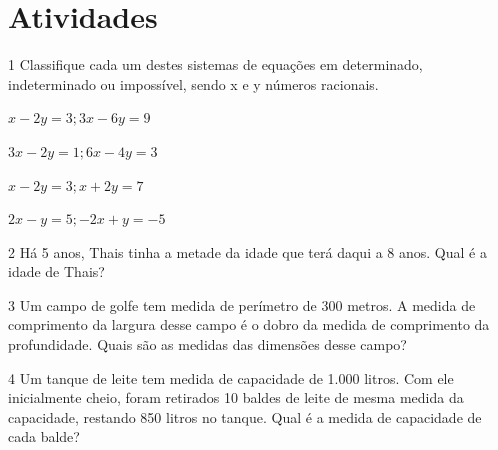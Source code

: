 \section{Atividades}

\num{1} Classifique cada um destes sistemas de equações em determinado,
indeterminado ou impossível, sendo x e y números racionais.

\begin{escolha}
\item $x - 2y = 3; 3x - 6y = 9$
\item $3x - 2y = 1; 6x - 4y = 3$
\item $x - 2y = 3; x + 2y = 7$
\item $2x - y = 5; -2x + y = -5$
\end{escolha}






\num{2} Há 5 anos, Thais tinha a metade da idade que terá daqui a 8 anos.
Qual é a idade de Thais?








\num{3} Um campo de golfe tem medida de perímetro de 300 metros. A medida de
comprimento da largura desse campo é o dobro da medida de comprimento da
profundidade. Quais são as medidas das dimensões desse campo?





\num{4} Um tanque de leite tem medida de capacidade de 1.000 litros. Com ele
inicialmente cheio, foram retirados 10 baldes de leite de mesma medida
da capacidade, restando 850 litros no tanque. Qual é a medida de
capacidade de cada balde?





